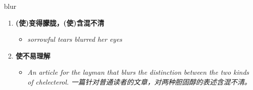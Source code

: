 
\begin{frame}
{\huge blur}
\begin{center}
\begin{enumerate}\Large
  \item \textbf{(使)变得朦胧，(使)含混不清}
  \begin{itemize}
    \item \em{\Large{sorrowful tears blurred her eyes}}
  \end{itemize}
  \item \textbf{使不易理解}
  \begin{itemize}
    \item \em{\Large{An article for the layman that blurs the distinction between the two kinds of chelecterol. 一篇针对普通读者的文章，对两种胆固醇的表述含混不清。}}
  \end{itemize}
\end{enumerate}
\end{center}
\end{frame}
